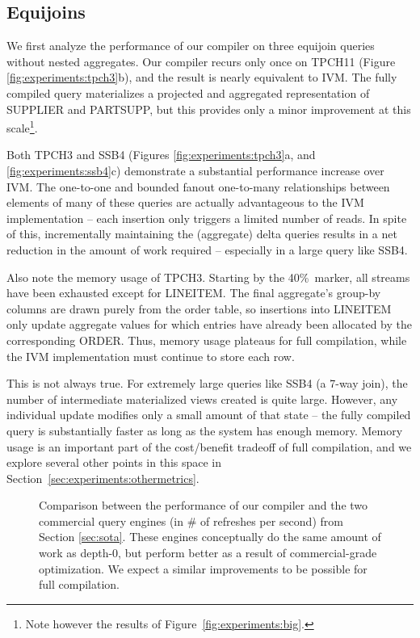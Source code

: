 \subsection{Equijoins}

We first analyze the performance of our compiler on three equijoin queries without nested aggregates.  Our compiler recurs only once on TPCH11 (Figure \ref{fig:experiments:tpch3}b), and the result is nearly equivalent to IVM.  The fully compiled query materializes a projected and aggregated representation of SUPPLIER and PARTSUPP, but this provides only a minor improvement at this scale\footnote{Note however the results of Figure~\ref{fig:experiments:big}.}.  

Both TPCH3 and SSB4 (Figures \ref{fig:experiments:tpch3}a, and \ref{fig:experiments:ssb4}c) demonstrate a substantial performance increase over IVM.  The one-to-one and bounded fanout one-to-many relationships between elements of many of these queries are actually advantageous to the IVM implementation -- each insertion only triggers a limited number of reads.  In spite of this, incrementally maintaining the (aggregate) delta queries results in a net reduction in the amount of work required -- especially in a large query like SSB4.

Also note the memory usage of TPCH3.  Starting by the 40\%\ marker, all streams have been exhausted except for LINEITEM.  The final aggregate's group-by columns are drawn purely from the order table, so insertions into LINEITEM only update aggregate values for which entries have already been allocated by the corresponding ORDER.  Thus, memory usage plateaus for full compilation, while the IVM implementation must continue to store each row.

This is not always true.  For extremely large queries like SSB4 (a 7-way join), the number of intermediate materialized views created is quite large.  However, any individual update modifies only a small amount of that state -- the fully compiled query is substantially faster as long as the system has enough memory.  Memory usage is an important part of the cost/benefit tradeoff of full compilation, and we explore several other points in this space in Section~\ref{sec:experiments:othermetrics}.

\begin{figure}
\begin{center}
\resizebox{3.3in}{!}{

}
\caption{Comparison between the performance of our compiler and the two commercial query engines (in \# of refreshes per second) from Section \ref{sec:sota}.  These engines conceptually do the same amount of work as depth-0, but perform better as a result of commercial-grade optimization.  We expect a similar improvements to be possible for full compilation.}
\label{fig:experiments:enginesVsDBT}
\vspace*{-0.3in}
\end{center}
\end{figure}

